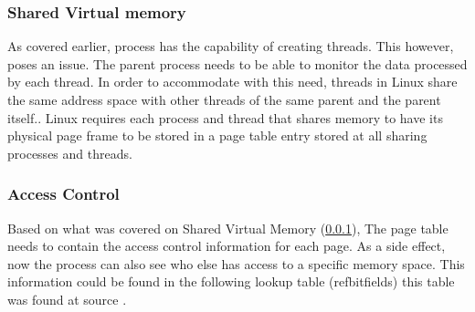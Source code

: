 \documentclass[journal,10pt,onecolumn,compsoc,letterpaper,draftclsnofoot,table,xcdraw]{IEEEtran} \usepackage[margin=0.75in]{geometry}
\begin{document}
\subsubsection{Shared Virtual memory}\label{SVM}
\noindent As covered earlier, process has the capability of creating threads. This however, poses an issue. The parent process needs to be able to monitor the data processed by each thread. In order to accommodate with this need, threads in Linux share the same address space with other threads of the same parent and the parent itself.\cite{1}. Linux requires each process and thread that shares memory to have its physical page frame to be stored in a page table entry stored at all sharing processes and threads.\cite{1}

\subsubsection{Access Control}
\noindent Based on what was covered on Shared Virtual Memory (\ref{SVM}), The page table needs to contain the access control information for each page. As a side effect, now the process can also see who else has access to a specific memory space. This information could be found in the following lookup table (ref{bitfields}) this table was found at source \cite{1}.
\end{document}
